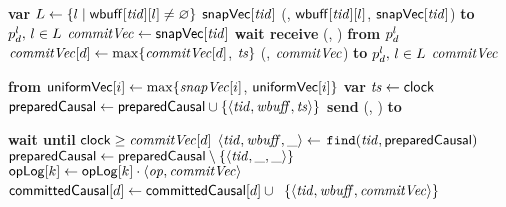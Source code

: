\begin{algorithm}
\begin{algorithmic}[1]
   \SpaceHandler
    
    \Function{\COMMITBLUE}{\tx} \label{alg:line:coordcommit}
       \State \textbf{var} $L \gets \{ \areplica \mid \writeset[\tx][\areplica] \neq
      \emptyset\}$
        \Return $\vecsnapshottime[\tx]$\label{alg:line:commitro}
      \EndIf
      \BLUEPREPARE(\tx, $\writeset[\tx][\areplica]$, $\vecsnapshottime[\tx]$)
      \textbf{to} $\partition^\areplica_d,\, \areplica \in L$\label{alg:line:sendprepare}
       $\commitvector \gets \vecsnapshottime[\tx]$\label{alg:line:commitvectorany}
       \label{alg:line:rcvprepare}
        \State \textbf{wait receive} \BLUEPREPARED(\tx, \ts) \textbf{from} $\partition^\areplica_d$
        \State $\commitvector[d] \gets \max \{\commitvector[d]$, $\ts\}$\label{alg:line:commitvectorlocal}
      \EndFor
      \COMMIT(\tx, $\commitvector$)
      \textbf{to} $\partition^\areplica_d,\, \areplica \in L$\label{alg:line:sendcommit}
      \State \Return $\commitvector$\label{alg:line:returncommit}
    \EndFunction

    \SpaceHandler

        \WhenRcv[\BLUEPREPARE(\tx, \aws, $\avecsnapshottime$)] \textbf{from} \partition
    \label{line:updateuniformprepare:receive}
      \label{line:updateuniformprepare:start}
        \State $\uniformsnapshot[i] \gets \max\{\avecsnapshottime[i]$,
          ${\sf uniformVec}[i]\}$\label{line:updateuniformprepare:end}
      \EndFor
      \State \textbf{var} $\ts \gets \clock$ \label{alg:line:PrepTime}
      \State $\preparedblue \gets \preparedblue \cup
        \{ \langle \tx, \aws, \ts\rangle \}$
      \State \textbf{send} \BLUEPREPARED(\tx, \ts) \textbf{to} \partition
    \EndWhenRcv

    \SpaceHandler

    \WhenRcv[\COMMIT($\tx$, $\commitvector$)]
    \label{alg:line:commit:receive}
      \State \textbf{wait until} $\clock \geq \commitvector[d]$ \label{alg:line:commitwait}
      \State $ \langle \tx, \aws, \_\rangle \gets$
        $\mathtt{find}(\tx, \preparedblue)$
      \State $\preparedblue \gets \preparedblue \setminus \{ \langle \tx,
        \_, \_\rangle \}$
        \State $\store[k] \gets \store[k] \cdot
          \langle \op, \commitvector \rangle$
      \EndFor
      \State ${\sf committedCausal}[d] \gets {\sf committedCausal}[d] \cup {}$
        \Statex\hspace{4.5cm}$\{\langle \tx, \aws,
        \commitvector\rangle\}$
    \EndWhenRcv
              


\end{algorithmic}
\end{algorithm}
